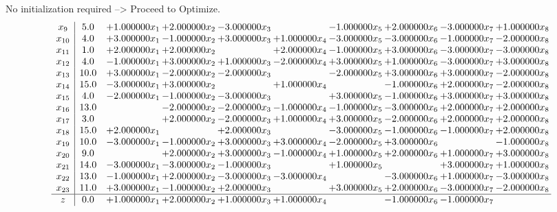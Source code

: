 \documentclass[10pt]{article}
\begin{document}
No initialization required --> Proceed to Optimize. 
\[\begin{array}{c| c c@{\hskip 2pt} c@{\hskip 2pt} c@{\hskip 2pt} c@{\hskip 2pt} c@{\hskip 2pt} c@{\hskip 2pt} c@{\hskip 2pt} c@{\hskip 2pt} }
 x_{9}   &  5.0 & + 1.000000 x_{1} & + 2.000000 x_{2} & -3.000000 x_{3} &   & -1.000000 x_{5} & + 2.000000 x_{6} & -3.000000 x_{7} & + 1.000000 x_{8}\\
 x_{10}   &  4.0 & + 3.000000 x_{1} & -1.000000 x_{2} & + 3.000000 x_{3} & + 1.000000 x_{4} & -3.000000 x_{5} & -3.000000 x_{6} & -1.000000 x_{7} & -2.000000 x_{8}\\
 x_{11}   &  1.0 & + 2.000000 x_{1} & + 2.000000 x_{2} &   & + 2.000000 x_{4} & -1.000000 x_{5} & + 3.000000 x_{6} & -3.000000 x_{7} & -3.000000 x_{8}\\
 x_{12}   &  4.0 & -1.000000 x_{1} & + 3.000000 x_{2} & + 1.000000 x_{3} & -2.000000 x_{4} & + 3.000000 x_{5} & + 1.000000 x_{6} & -3.000000 x_{7} & + 3.000000 x_{8}\\
 x_{13}   &  10.0 & + 3.000000 x_{1} & -2.000000 x_{2} & -2.000000 x_{3} &   & -2.000000 x_{5} & + 3.000000 x_{6} & + 3.000000 x_{7} & -2.000000 x_{8}\\
 x_{14}   &  15.0 & -3.000000 x_{1} & + 3.000000 x_{2} &   & + 1.000000 x_{4} &   & -1.000000 x_{6} & + 2.000000 x_{7} & -2.000000 x_{8}\\
 x_{15}   &  4.0 & -2.000000 x_{1} & -1.000000 x_{2} & -3.000000 x_{3} &   & + 3.000000 x_{5} & -1.000000 x_{6} & + 3.000000 x_{7} & + 3.000000 x_{8}\\
 x_{16}   &  13.0  &   & -2.000000 x_{2} & -2.000000 x_{3} & -1.000000 x_{4} & -1.000000 x_{5} & -3.000000 x_{6} & + 2.000000 x_{7} & + 2.000000 x_{8}\\
 x_{17}   &  3.0  &   & + 2.000000 x_{2} & -2.000000 x_{3} & + 1.000000 x_{4} & + 3.000000 x_{5} & -2.000000 x_{6} & + 2.000000 x_{7} & + 2.000000 x_{8}\\
 x_{18}   &  15.0 & + 2.000000 x_{1} &   & + 2.000000 x_{3} &   & -3.000000 x_{5} & -1.000000 x_{6} & -1.000000 x_{7} & + 2.000000 x_{8}\\
 x_{19}   &  10.0 & -3.000000 x_{1} & -1.000000 x_{2} & + 3.000000 x_{3} & + 3.000000 x_{4} & -2.000000 x_{5} & + 3.000000 x_{6} &   & -1.000000 x_{8}\\
 x_{20}   &  9.0  &   & + 2.000000 x_{2} & + 3.000000 x_{3} & -1.000000 x_{4} & + 1.000000 x_{5} & + 2.000000 x_{6} & + 1.000000 x_{7} & + 3.000000 x_{8}\\
 x_{21}   &  14.0 & -3.000000 x_{1} & -3.000000 x_{2} & -1.000000 x_{3} &   & + 1.000000 x_{5} &   & + 3.000000 x_{7} & + 1.000000 x_{8}\\
 x_{22}   &  13.0 & -1.000000 x_{1} & + 2.000000 x_{2} & -3.000000 x_{3} & -3.000000 x_{4} &   & -3.000000 x_{6} & + 1.000000 x_{7} & -3.000000 x_{8}\\
 x_{23}   &  11.0 & + 3.000000 x_{1} & -1.000000 x_{2} & + 2.000000 x_{3} &   & + 3.000000 x_{5} & + 2.000000 x_{6} & -3.000000 x_{7} & -2.000000 x_{8}\\
\hline
z    &  0.0 & + 1.000000 x_{1} & + 2.000000 x_{2} & + 1.000000 x_{3} & + 1.000000 x_{4} &   & -1.000000 x_{6} & -1.000000 x_{7} &   \\
\end{array}\]
\end{document}
